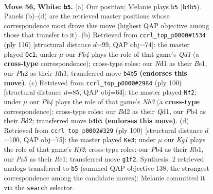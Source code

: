 \documentclass[11pt]{article}
\begin{document}
\clearpage

\begin{figure}[p]\centering
\begin{subfigure}{0.46\textwidth}\centering
\resizebox{\linewidth}{!}{%
\newchessgame
\chessboard[
  setfen={nr4k1/3qbr2/p3n3/P1p2p1p/1P1p1Pp1/N5P1/QR1BP2P/2RN2K1 w - - 3 56},
  showmover=false,
  pgfstyle=straightmove, color=movearrow, markmove={b4-b5}
]}
\caption{}
\end{subfigure}\hfill
\begin{subfigure}{0.46\textwidth}\centering
\resizebox{\linewidth}{!}{%
\newchessgame
\chessboard[
  setfen={4q1k1/r5p1/1rpbp2p/3p1p2/1P1P1PnP/pR1NP1P1/P7/3QB1KR w - - 21 59},
  showmover=false,
  pgfstyle=straightmove, color=movearrow, markmove={d1-c1}
]}
\caption{}
\end{subfigure}
\\[4pt]
\begin{subfigure}{0.46\textwidth}\centering
\resizebox{\linewidth}{!}{%
\newchessgame
\chessboard[
  setfen={r2b1qk1/r7/Pp1p2n1/2pPp1n1/R1P1PpP1/R6N/K2BB2P/3Q4 w - - 3 51},
  showmover=false,
  pgfstyle=straightmove, color=movearrow, markmove={h3-f2}
]}
\caption{}
\end{subfigure}\hfill
\begin{subfigure}{0.46\textwidth}\centering
\resizebox{\linewidth}{!}{%
\newchessgame
\chessboard[
  setfen={1rrq2k1/7p/2b3p1/p2pPpPn/P1pP1P1P/2Q5/2B1NK2/1RR5 w - - 5 51},
  showmover=false,
  pgfstyle=straightmove, color=movearrow, markmove={f2-e3}
]}
\caption{}
\end{subfigure}
\caption{\textbf{Move 56, White: \texttt{b5}.} (a) Our position; Melanie plays \texttt{b5} (\texttt{b4b5}). Panels (b)--(d) are the retrieved master positions whose correspondence most drove this move (highest QAP objective among those that transfer to it). (b) Retrieved from \texttt{ccrl\_top\_p0000\#1534} (ply 116) [structural distance $d$=99, QAP obj=74]: the master played \texttt{Qc1}; under $\mu$ our \emph{Pb4} plays the role of that game's \emph{Qd1} (a \textbf{cross-type} correspondence); cross-type roles: our \emph{N}d1 as their \emph{B}e1, our \emph{P}h2 as their \emph{R}h1; transferred move \texttt{b4b5} \textbf{(endorses this move)}. (c) Retrieved from \texttt{ccrl\_top\_p0000\#2984} (ply 100) [structural distance $d$=85, QAP obj=64]: the master played \texttt{Nf2}; under $\mu$ our \emph{Pb4} plays the role of that game's \emph{Nh3} (a \textbf{cross-type} correspondence); cross-type roles: our \emph{B}d2 as their \emph{Q}d1, our \emph{P}b4 as their \emph{B}d2; transferred move \texttt{b4b5} \textbf{(endorses this move)}. (d) Retrieved from \texttt{ccrl\_top\_p0002\#329} (ply 100) [structural distance $d$=100, QAP obj=75]: the master played \texttt{Ke3}; under $\mu$ our \emph{Kg1} plays the role of that game's \emph{Kf2}; cross-type roles: our \emph{P}b4 as their \emph{R}b1, our \emph{P}a5 as their \emph{R}c1; transferred move \texttt{g1f2}. Synthesis: 2 retrieved analogs transferred to \texttt{b5} (summed QAP objective 138, the strongest correspondence among the candidate moves); Melanie committed it via the \texttt{search} selector.}
\label{fig:thought-m110}
\end{figure}
\end{document}
